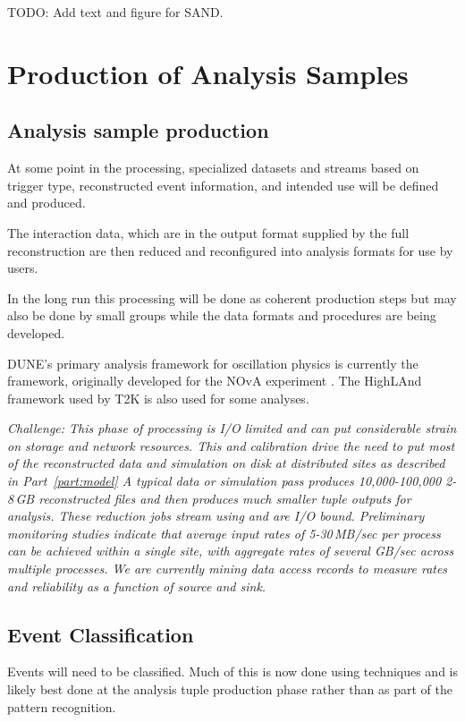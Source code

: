 \documentclass[../main-v1.tex]{subfiles}
\begin{document}
TODO:  {\color{red}Add text and figure for SAND.}

\section{Production of Analysis Samples}

\subsection{Analysis sample production}
At some point in the processing, specialized datasets and streams based on trigger type, reconstructed event information, and intended use will be defined and produced.

The interaction data, which are in the output format supplied by the full reconstruction are then reduced and reconfigured into analysis formats for use by users. 

In the long run this processing will be done as coherent production steps but may also be done by small groups while the data formats and procedures are being developed.

DUNE's primary analysis framework for oscillation physics is currently   the  framework, originally developed for the NOvA experiment \cite{Backhouse:2015wlj,  bib:cafana}. The HighLAnd framework used by T2K is also used for some analyses. 



{\it Challenge:  This phase of processing is I/O limited and can put considerable strain on storage and network resources.  This and calibration drive the need to put most of the reconstructed data and simulation on disk at distributed sites as described in Part~\ref{part:model}
A typical  data or simulation pass produces  10,000-100,000 2-8\,GB reconstructed files and  then produces much smaller tuple outputs for analysis.  These reduction jobs stream using  and are I/O bound. Preliminary monitoring studies indicate that average input rates of 5-30\,MB/sec per process can be achieved within a single site, with aggregate rates of several GB/sec across multiple processes. We are currently mining data access records to measure rates and reliability as a function of source and sink. }

\subsection{Event Classification}
Events will need to be classified.  Much of this is now done using  techniques and is likely best done at the analysis tuple production phase rather than as part of the pattern recognition. 
\end{document}
